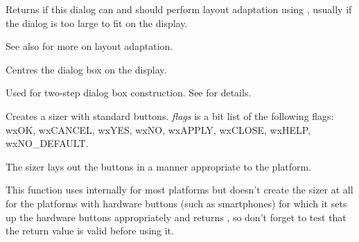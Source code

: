 \label{wxdialogcandolayoutadaptation}


Returns \true if this dialog can and should perform layout adaptation using , usually if
the dialog is too large to fit on the display.

See also  for more on layout adaptation.

\label{wxdialogcentre}


Centres the dialog box on the display.




\label{wxdialogcreate}


Used for two-step dialog box construction. See \rtfsp
for details.


\label{wxdialogcreatebuttonsizer}


Creates a sizer with standard buttons. {\it flags} is a bit list
of the following flags: wxOK, wxCANCEL, wxYES, wxNO, wxAPPLY, wxCLOSE, 
wxHELP, wxNO\_DEFAULT.

The sizer lays out the buttons in a manner appropriate to the platform.

This function uses  
internally for most platforms but doesn't create the sizer at all for the
platforms with hardware buttons (such as smartphones) for which it sets up the
hardware buttons appropriately and returns \NULL, so don't forget to test that
the return value is valid before using it.


